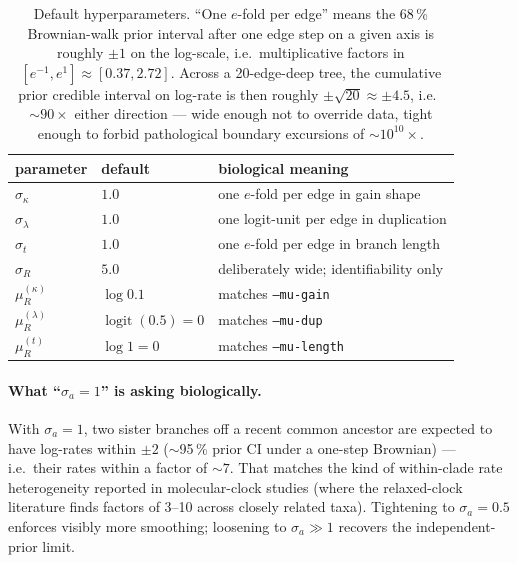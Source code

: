 \documentclass[11pt]{article}
\newcommand{\troot}{R}
\newcommand{\rate}{\kappa}             %
\newcommand{\dup}{\lambda}             %
\newcommand{\loss}{\mu}                %
\newcommand{\edgelen}{t}               %
\DeclareMathOperator{\logit}{logit}
\theoremstyle{definition}
\begin{document}
\begin{table}[h]
\centering
\renewcommand{\arraystretch}{1.15}
\begin{tabular}{lll}
\toprule
parameter & default & biological meaning \\
\midrule
$\sigma_\rate$ & $1.0$ & one $e$-fold per edge in gain shape \\
$\sigma_\dup$ & $1.0$ & one logit-unit per edge in duplication \\
$\sigma_\edgelen$ & $1.0$ & one $e$-fold per edge in branch length \\
$\sigma_\troot$ & $5.0$ & deliberately wide; identifiability only \\
$\loss^{(\rate)}_\troot$ & $\log 0.1$ & matches \texttt{--mu-gain} \\
$\loss^{(\dup)}_\troot$ & $\logit(0.5) = 0$ & matches \texttt{--mu-dup} \\
$\loss^{(\edgelen)}_\troot$ & $\log 1 = 0$ & matches \texttt{--mu-length} \\
\bottomrule
\end{tabular}
\caption{Default hyperparameters. ``One $e$-fold per edge'' means
the 68\,\% Brownian-walk prior interval after one edge step on a
given axis is roughly $\pm 1$ on the log-scale, i.e.\ multiplicative
factors in $[e^{-1}, e^{1}] \approx [0.37, 2.72]$. Across a
20-edge-deep tree, the cumulative prior credible interval on
log-rate is then roughly $\pm \sqrt{20} \approx \pm 4.5$, i.e.\
$\sim 90\times$ either direction --- wide enough not to override
data, tight enough to forbid pathological boundary excursions of
$\sim 10^{10}\times$.}
\end{table}

\paragraph{What ``$\sigma_a = 1$'' is asking biologically.}
With $\sigma_a = 1$, two sister branches off a recent common
ancestor are expected to have log-rates within $\pm 2$ ($\sim$95\,\%
prior CI under a one-step Brownian) --- i.e.\ their rates within a
factor of $\sim 7$. That matches the kind of within-clade rate
heterogeneity reported in molecular-clock studies (where the
relaxed-clock literature finds factors of 3--10 across closely
related taxa). Tightening to $\sigma_a = 0.5$ enforces visibly more
smoothing; loosening to $\sigma_a \gg 1$ recovers the
independent-prior limit.
\end{document}
